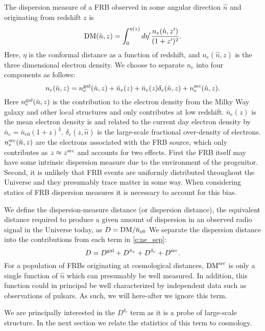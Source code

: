 \documentclass[twocolumn,prd,noshowpacs,nofootinbib,amsmath,amssymb]{revtex4}
\begin{document}
The dispersion measure of a FRB observed in some angular direction $\hat{n}$ and
originating from redshift $z$ is
\begin{equation}
    {\rm DM}(\hat{n}, z) = \int_0^{\eta(z)} d\eta'
        \frac{n_e(\hat{n}, z')}{(1+z')^2}.
\end{equation}
Here, $\eta$ is the conformal distance as a function of redshift, and
$n_e(\hat{n}, z)$ is the three dimensional electron density.  We choose to
separate $n_e$ into four components as follows:
\begin{equation}
\label{e:ne_sep}
n_e(\hat{n}, z) = n_e^{\rm gal}(\hat{n}, z) + \bar{n}_e(z) +
    \bar{n}_e(z)\delta_e(\hat{n}, z) + n_e^{\rm src}(\hat{n}, z).
\end{equation}
Here $n_e^{\rm gal}(\hat{n}, z)$ is the contribution to the electron density
from the Milky Way galaxy and other local structures and only contributes at
low redshift. $\bar{n}_e(z)$ is the mean electron density is and related to the
current day electron density by $\bar{n}_e = \bar{n}_{e0} (1+z)^3$. 
$\delta_e(z,\hat{n})$ is the large-scale fractional over-density of electrons.
$n_e^{\rm src}(\hat{n}, z)$ are the electrons associated with the FRB source,
which only contributes as $z \approx z^{\rm src}$ and accounts for two effects.
First the FRB itself
may have some intrinsic dispersion measure due to the environment of the
progenitor.  Second, it is unlikely that FRB events are uniformly distributed
throughout the Universe and they presumably trace matter in some way. When
considering statics of FRB dispersion measures it is necessary to account for
this bias.

We define the dispersion-measure distance (or dispersion distance),
the equivalent distance required to
produce a given amount of dispersion in an observed radio signal in the
Universe today, as $ D = {{\rm DM}}/{\bar{n}_{e0}}$
We separate the dispersion distance into the contributions from each
term in \ref{e:ne_sep}:
\begin{equation}
\label{e:D_sep}
D = D^{\rm gal} + D^{\bar{n}_e} + D^{\delta_e} + D^{\rm src}.
\end{equation}
For a population of FRBs originating at cosmological distances, ${\rm DM}^{\rm
src}$ is only a single function of $\hat{n}$ which can presumably be well
measured.  In addition, this function could in principal be well characterized
by independent data such as observations of pulsars.  As such, we will
here-after we ignore this term.

We are principally interested in the $D^{\delta_e}$ term as it is a probe of
large-scale structure. In the next section we relate the statistics of this
term to cosmology.
\end{document}
